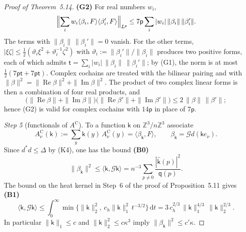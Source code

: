 \documentclass[11pt,letterpaper,reqno]{amsart}
\theoremstyle{definition}
\begin{document}
\begin{proof}[Proof of Theorem~5.14]
\textbf{(G2)} For real numbers $w_i$,
\begin{equation*}
\Bigl\|\sum_iw_i\langle\beta_i,F\rangle\langle\beta_i',F\rangle\Bigr\|_{L^{\mathsf p}}\le7\mathsf p\sum_i|w_i|\,\|\beta_i\|\,\|\beta_i'\|.
\end{equation*}
The terms with $\|\beta_i\|\,\|\beta_i'\|=0$ vanish.
For the other terms, $|\xi\zeta|\le\frac12(\vartheta_i\xi^2+\vartheta_i^{-1}\zeta^2)$ with $\vartheta_i:=\|\beta_i'\|/\|\beta_i\|$ produces two positive forms, each of which admits $\mathsf t=\sum_i|w_i|\,\|\beta_i\|\,\|\beta_i'\|$;
by (G1), the norm is at most $\frac12(7\mathsf p\mathsf t+7\mathsf p\mathsf t)$.
Complex cochains are treated with the bilinear pairing and with $\|\beta\|^2=\allowbreak \|\operatorname{Re}\beta\|^2+\|\operatorname{Im}\beta\|^2$.
The product of two complex linear forms is then a combination of four real products, and
\begin{equation*}
\bigl(\|\operatorname{Re}\beta\|+\|\operatorname{Im}\beta\|\bigr)\bigl(\|\operatorname{Re}\beta'\|+\|\operatorname{Im}\beta'\|\bigr)\le2\,\|\beta\|\,\|\beta'\|;
\end{equation*}
hence (G2) is valid for complex cochains with $14\mathsf p$ in place of $7\mathsf p$.

\emph{Step 5} (functionals of $A^{\mathrm C}$).
To a function $\mathsf k$ on $\mathbb Z^3/n\mathbb Z^3$ associate
\begin{equation*}
A^{\mathrm C}_\nu(\mathsf k):=\sum_y\mathsf k(y)\,A^{\mathrm C}_\nu(y)=\langle\beta_{\mathsf k},F\rangle,\qquad\beta_{\mathsf k}=\mathcal Gd(\mathsf ke_\nu).
\end{equation*}
Since $d^*d\le\Delta$ by (K4), one has the bound \textbf{(B0)}
\begin{equation}
\tag{B0}
\|\beta_{\mathsf k}\|^2\le\langle\mathsf k,\mathcal G\mathsf k\rangle=n^{-3}\sum_{p\ne0}\frac{|\hat{\mathsf k}(p)|^2}{\mathsf q(p)}.
\end{equation}
The bound on the heat kernel in Step~6 of the proof of Proposition~5.11 gives \textbf{(B1)}
\begin{equation}
\tag{B1}
\langle\mathsf k,\mathcal G\mathsf k\rangle\le\int_0^\infty\min\bigl\{\|\mathsf k\|_2^2,\ c_h\|\mathsf k\|_1^2\,t^{-3/2}\bigr\}\,\mathrm dt=3\,c_h^{2/3}\,\|\mathsf k\|_1^{4/3}\,\|\mathsf k\|_2^{2/3}.
\end{equation}
In particular $\|\mathsf k\|_1\le c$ and $\|\mathsf k\|_2^2\le c\kappa^3$ imply $\|\beta_{\mathsf k}\|^2\le c'\kappa$.


\end{proof}
\end{document}
